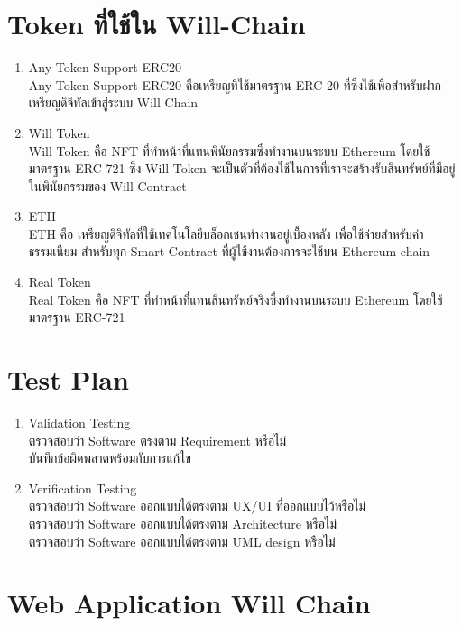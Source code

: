 \documentclass[12pt,oneside,openright,a4paper]{cpe-thai-project}
\begin{document}
\section{Token ที่ใช้ใน Will-Chain}
\begin{enumerate}[label=\thesection.\arabic*,leftmargin=0pt,itemindent=1.25cm]
	\item Any Token Support ERC20\\
		\tab Any Token Support ERC20 คือเหรียญที่ใช้มาตรฐาน ERC-20 ที่ซึ่งใช้เพื่อสำหรับฝากเหรียญดิจิทัลเข้าสู่ระบบ Will Chain
	\item Will Token \\
		\tab  Will Token คือ NFT ที่ทำหน้าที่แทนพินัยกรรมซึ่งทำงานบนระบบ Ethereum โดยใช้มาตรฐาน ERC-721 ซึ่ง Will Token จะเป็นตัวที่ต้องใช้ในการที่เราจะสร้างรับสินทรัพย์ที่มีอยู่ในพินัยกรรมของ Will Contract
	\item ETH \\
		\tab  ETH คือ เหรียญดิจิทัลที่ใช้เทคโนโลยีบล็อกเชนทำงานอยู่เบื้องหลัง เพื่อใช้จ่ายสำหรับค่าธรรมเนียม สำหรับทุก Smart Contract ที่ผู้ใช้งานต้องการจะใช้บน Ethereum chain
	
	\item Real Token	\\		
		\tab Real Token คือ NFT ที่ทำหน้าที่แทนสินทรัพย์จริงซึ่งทำงานบนระบบ Ethereum โดยใช้มาตรฐาน ERC-721 
	\end{enumerate}
\section{Test Plan}
\begin{enumerate}[label=\thesection.\arabic*,leftmargin=0pt,itemindent=1.25cm]
\item Validation Testing \\
\tab \tab ตรวจสอบว่า Software ตรงตาม Requirement หรือไม่\\
\tab \tab บันทึกข้อผิดพลาดพร้อมกับการแก้ไข
\item Verification Testing \\
\tab \tab ตรวจสอบว่า Software ออกแบบได้ตรงตาม UX/UI ที่ออกแบบไว้หรือไม่\\
\tab \tab ตรวจสอบว่า Software ออกแบบได้ตรงตาม Architecture หรือไม่\\
\tab \tab ตรวจสอบว่า Software ออกแบบได้ตรงตาม UML design หรือไม่\\
\end{enumerate}
\clearpage
\section{Web Application Will Chain}
\end{document}
